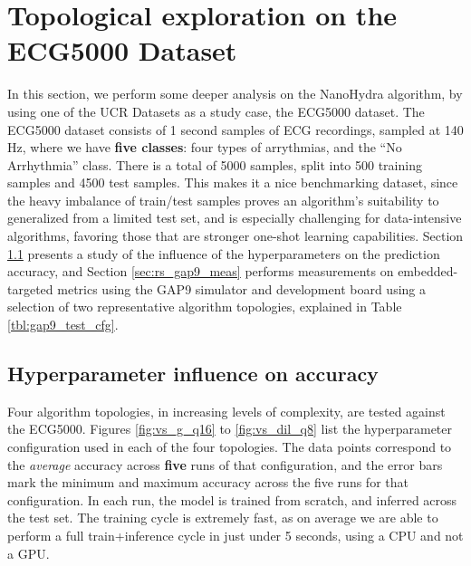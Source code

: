 \section{Topological exploration on the ECG5000 Dataset}\label{sec:rs_arch_ecg5000}
In this section, we perform some deeper analysis on the NanoHydra algorithm, by using one of the UCR Datasets as a study case, the ECG5000 dataset.
The ECG5000 dataset consists of 1 second samples of ECG recordings, sampled at 140 Hz, where we have \textbf{five classes}: four types of arrythmias, and the ``No Arrhythmia'' class.
There is a total of 5000 samples, split into 500 training samples and 4500 test samples. This makes it a nice benchmarking dataset, since the heavy imbalance of train/test samples proves an
algorithm's suitability to generalized from a limited test set, and is especially challenging for data-intensive algorithms, favoring those that are stronger one-shot learning capabilities.
Section \ref{sec:rs_acc_topo} presents a study of the influence of the hyperparameters on the prediction accuracy, and Section \ref{sec:rs_gap9_meas} performs
measurements on embedded-targeted metrics using the GAP9 simulator and development board using a selection of two representative algorithm topologies, explained in Table \ref{tbl:gap9_test_cfg}.

\subsection{Hyperparameter influence on accuracy}\label{sec:rs_acc_topo}
Four algorithm topologies, in increasing levels of complexity, are tested against the ECG5000. Figures \ref{fig:vs_g_q16} to \ref{fig:vs_dil_q8} list the hyperparameter configuration used in each of the four topologies.
The data points correspond to the \emph{average} accuracy across \textbf{five} runs of that configuration, and the error bars mark the minimum and maximum accuracy across the five runs for that configuration. In each run, the model
is trained from scratch, and inferred across the test set. The training cycle is extremely fast, as on average we are able to perform a full train+inference cycle in just under 5 seconds, using a CPU and not a GPU. 

